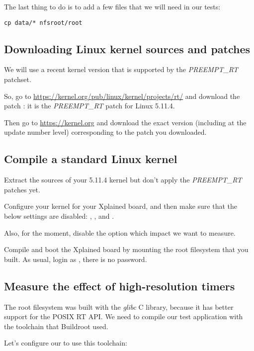 The last thing to do is to add a few files that we will need in our
tests:

\begin{verbatim}
cp data/* nfsroot/root
\end{verbatim}

\subsection{Downloading Linux kernel sources and patches}

We will use a recent kernel version that is supported by the {\em
  PREEMPT\_RT} patchset.

So, go to \url{https://kernel.org/pub/linux/kernel/projects/rt/} and
download the patch : it is the {\em
  PREEMPT\_RT} patch for Linux 5.11.4.

Then go to \url{https://kernel.org} and download the exact version
(including at the update number level) corresponding to the patch you
downloaded.

\subsection{Compile a standard Linux kernel}

Extract the sources of your 5.11.4 kernel but don't apply the {\em
  PREEMPT\_RT} patches yet.

Configure your kernel for your Xplained board, and then make sure
that the below settings are disabled:
, ,
 and .

Also, for the moment, disable the 
option which impact we want to measure.

Compile and boot the Xplained board by mounting the root filesystem that you
built. As usual, login as , there is no password.

\subsection{Measure the effect of high-resolution timers}

The root filesystem was built with the {\em glibc} C library, because
it has better support for the POSIX RT API. We need to compile our
test application with the toolchain that Buildroot used.

Let's configure our  to use this toolchain:

